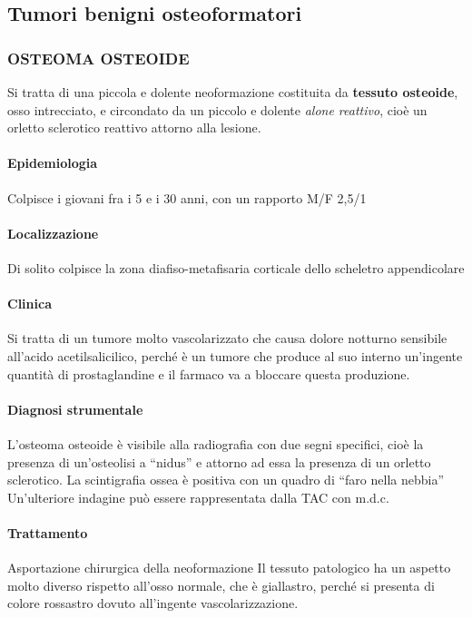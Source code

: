 \subsection{Tumori benigni osteoformatori}

\subsubsection{OSTEOMA OSTEOIDE}

Si tratta di una piccola e dolente neoformazione costituita da \textbf{tessuto osteoide}, osso intrecciato, e circondato da un piccolo e dolente \emph{alone reattivo}, cioè un orletto sclerotico reattivo attorno alla lesione.

\paragraph{Epidemiologia}
Colpisce i giovani fra i 5 e i 30 anni, con un rapporto M/F 2,5/1

\paragraph{Localizzazione}
Di solito colpisce la zona diafiso-metafisaria corticale dello scheletro appendicolare

\paragraph{Clinica}
Si tratta di un tumore molto vascolarizzato che causa dolore notturno sensibile all'acido acetilsalicilico, perché è un tumore che produce al suo interno un'ingente quantità di prostaglandine e il farmaco va a bloccare questa produzione.

\paragraph{Diagnosi strumentale}
L'osteoma osteoide è visibile alla radiografia con due segni specifici, cioè la presenza di un'osteolisi a ``nidus'' e attorno ad essa la presenza di un orletto sclerotico.
La scintigrafia ossea è positiva con un quadro di ``faro nella nebbia''
Un'ulteriore indagine può essere rappresentata dalla TAC con m.d.c.

\paragraph{Trattamento}
Asportazione chirurgica della neoformazione
Il tessuto patologico ha un aspetto molto diverso rispetto all'osso normale, che è giallastro, perché si presenta di colore rossastro dovuto all'ingente vascolarizzazione.

